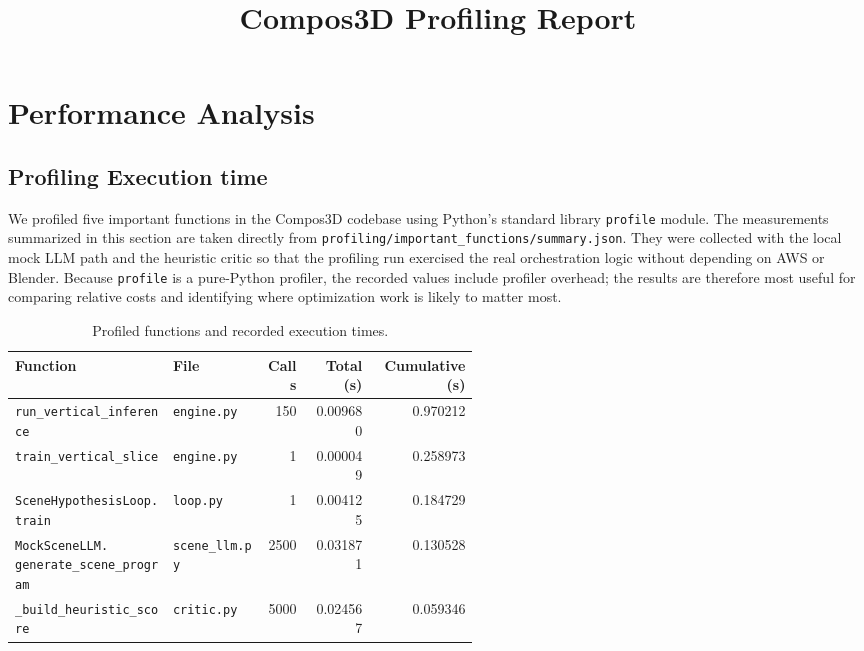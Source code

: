 \documentclass{article}
\title{Compos3D Profiling Report}
\author{}
\date{}
\begin{document}
\maketitle

\section{Performance Analysis}
\subsection{Profiling Execution time}
We profiled five important functions in the Compos3D codebase using Python's standard library \texttt{profile} module. The measurements summarized in this section are taken directly from \texttt{profiling/important\_functions/summary.json}. They were collected with the local mock LLM path and the heuristic critic so that the profiling run exercised the real orchestration logic without depending on AWS or Blender. Because \texttt{profile} is a pure-Python profiler, the recorded values include profiler overhead; the results are therefore most useful for comparing relative costs and identifying where optimization work is likely to matter most.

\begin{table}[h]
\centering
\small
\renewcommand{\arraystretch}{1.15}
\begin{tabular}{|>{\raggedright\arraybackslash}p{0.34\linewidth}|>{\raggedright\arraybackslash}p{0.20\linewidth}|r|r|r|}
\hline
Function & File & Calls & Total (s) & Cumulative (s) \\
\hline
\texttt{run\_vertical\_inference} & \texttt{engine.py} & 150 & 0.009680 & 0.970212 \\
\hline
\texttt{train\_vertical\_slice} & \texttt{engine.py} & 1 & 0.000049 & 0.258973 \\
\hline
\texttt{SceneHypothesisLoop.train} & \texttt{loop.py} & 1 & 0.004125 & 0.184729 \\
\hline
\rule{0pt}{3.1ex}\shortstack[l]{\texttt{MockSceneLLM.}\\\texttt{generate\_scene\_program}} & \texttt{scene\_llm.py} & 2500 & 0.031871 & 0.130528 \\
\hline
\texttt{\_build\_heuristic\_score} & \texttt{critic.py} & 5000 & 0.024567 & 0.059346 \\
\hline
\end{tabular}
\caption{Profiled functions and recorded execution times.}
\end{table}
\end{document}
